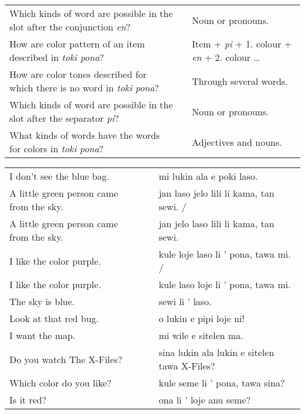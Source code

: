 \begin{supertabular}{p{5,5cm}|ll}
    Which kinds of word are possible in the slot after the conjunction \textit{en}? &  & Noun or pronouns.                                              \\
    How are color pattern of an item described in \textit{toki pona}?               &  & Item + \textit{pi} + 1. colour + \textit{en} + 2. colour \dots \\
    How are color tones described for which there is no word in \textit{toki pona}? &  & Through several words.                                         \\
    Which kinds of word are possible in the slot after the separator \textit{pi}?   &  & Noun or pronouns.                                              \\
    What kinds of words have the words for colors in \textit{toki pona}?            &  & Adjectives and nouns.                                          \\
\end{supertabular}

\begin{supertabular}{p{5,5cm}|ll}
    I don't see the blue bag.                &  & mi lukin ala e poki laso.                    \\
    A little green person came from the sky. &  & jan laso jelo lili li kama, tan sewi. /      \\
    A little green person came from the sky. &  & jan jelo laso lili li kama, tan sewi.        \\
    I like the color purple.                 &  & kule loje laso li ' pona, tawa mi. /         \\
    I like the color purple.                 &  & kule laso loje li ' pona, tawa mi.           \\
    The sky is blue.                         &  & sewi li ' laso.                              \\
    Look at that red bug.                    &  & o lukin e pipi loje ni!                      \\
    I want the map.                          &  & mi wile e sitelen ma.                        \\
    Do you watch The X-Files?                &  & sina lukin ala lukin e sitelen tawa X-Files? \\
    Which color do you like?                 &  & kule seme li ' pona, tawa sina?              \\
    Is it red?                               &  & ona li ' loje anu seme?                      \\
\end{supertabular}

